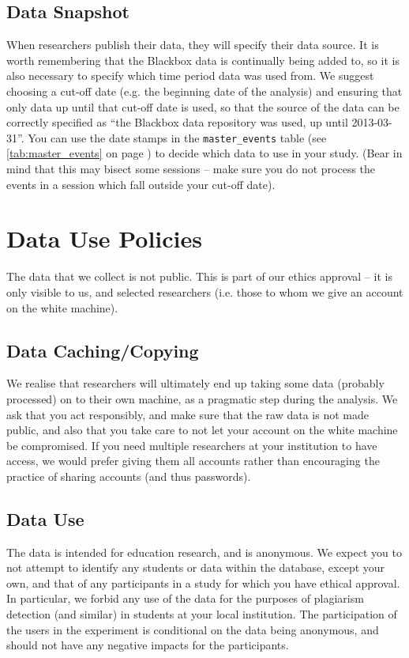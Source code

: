 \documentclass{report}
\newcommand{\myref}[1]{\autoref{#1} on page \pageref*{#1}}
\newcommand{\tabref}[1]{\lstinline|#1| table (see \myref{tab:#1})}
\begin{document}
\section{Data Snapshot}

When researchers publish their data, they will specify their data source.  It
is worth remembering that the Blackbox data is continually being added to, so
it is also necessary to specify which time period data was used from.  We
suggest choosing a cut-off date (e.g. the beginning date of the analysis) and
ensuring that only data up until that cut-off date is used, so that the source
of the data can be correctly specified as ``the Blackbox data repository was
used, up until 2013-03-31''.  You can use the date stamps in the
\tabref{master_events} to decide which data to use in your study.  (Bear in
mind that this may bisect some sessions -- make sure you do not process the
events in a session which fall outside your cut-off date).

\chapter{Data Use Policies}
\label{sec:data_use}

The data that we collect is not public.  This is part of our ethics approval
-- it is only visible to us, and selected researchers (i.e. those to whom we
give an account on the white machine).  

\section{Data Caching/Copying}

We realise that researchers will ultimately end up taking some data (probably
processed) on to their own machine, as a pragmatic step during the analysis.
We ask that you act responsibly, and make sure that the raw data is not made
public, and also that you take care to not let your account on the white
machine be compromised.  If you need multiple researchers at your institution
to have access, we would prefer giving them all accounts rather than
encouraging the practice of sharing accounts (and thus passwords).


\section{Data Use}

The data is intended for education research, and is anonymous.  We expect you
to not attempt to identify any students or data within the database, except
your own, and that of any participants in a study for which you have ethical
approval.  In particular, we forbid any use of the data for the purposes of
plagiarism detection (and similar) in students at your local institution.  The
participation of the users in the experiment is conditional on the data being
anonymous, and should not have any negative impacts for the participants.
\end{document}
